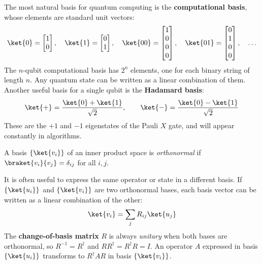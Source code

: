 \documentclass[oneside]{academica}
\begin{document}
The most natural basis for quantum computing is the \textbf{computational basis}, whose elements are standard unit vectors:
\begin{equation*}
  \ket{0}=\begin{bmatrix}1\\0\end{bmatrix},\quad
  \ket{1}=\begin{bmatrix}0\\1\end{bmatrix},\quad
  \ket{00}=\begin{bmatrix}1\\0\\0\\0\end{bmatrix},\quad
  \ket{01}=\begin{bmatrix}0\\1\\0\\0\end{bmatrix},\quad\ldots
\end{equation*}
The $n$-qubit computational basis has $2^n$ elements, one for each binary string of length $n$.
Any quantum state can be written as a linear combination of them.
Another useful basis for a single qubit is the \textbf{Hadamard basis}:
\begin{equation*}
  \ket{+}=\frac{\ket{0}+\ket{1}}{\sqrt{2}},\qquad \ket{-}=\frac{\ket{0}-\ket{1}}{\sqrt{2}}
\end{equation*}
These are the $+1$ and $-1$ eigenstates of the Pauli $X$ gate, and will appear constantly in algorithms.

\begin{definition*}
  A basis $\{\ket{v_i}\}$ of an inner product space is \emph{orthonormal} if
  $\braket{v_i}{v_j}=\delta_{ij}$ for all $i,j$.
\end{definition*}

It is often useful to express the same operator or state in a different basis.
If $\{\ket{u_i}\}$ and $\{\ket{v_i}\}$ are two orthonormal bases, each basis vector can be written as a linear combination of the other:
\begin{equation*}
  \ket{v_i} = \sum_j R_{ij}\ket{u_j}
\end{equation*}
The \textbf{change-of-basis matrix} $R$ is always \emph{unitary} when both bases are orthonormal, so $R^{-1}=R^\dagger$ and $RR^\dagger=R^\dagger R=I$.
An operator $A$ expressed in basis $\{\ket{u_i}\}$ transforms to $R^\dagger AR$ in basis $\{\ket{v_i}\}$.
\end{document}
